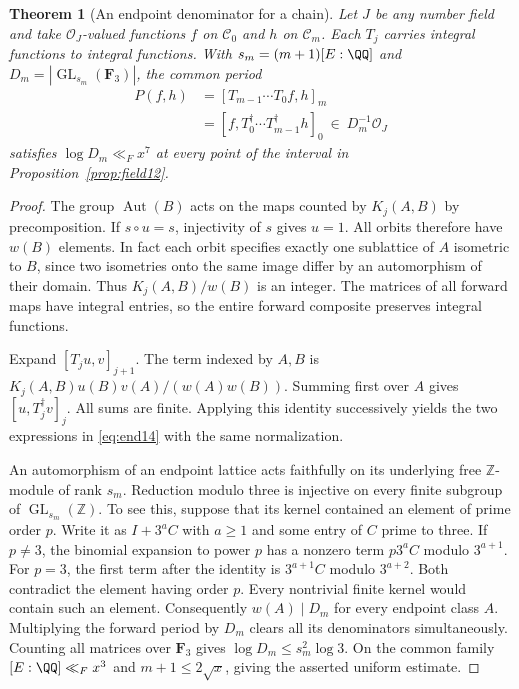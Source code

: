 \documentclass[a4paper,11pt]{article}
\newtheorem{theorem}[proposition]{Theorem}
\theoremstyle{definition}
\theoremstyle{remark}
\newcommand{\ZZ}{\mathbb Z}\newcommand{\ord}{\operatorname{ord}}
\numberwithin{equation}{section}
\begin{document}
\begin{theorem}[An endpoint denominator for a chain]\label{thm:end14}
Let \(J\) be any number field and take \(\mathcal O_J\)-valued functions \(f\) on \(\mathcal C_0\) and \(h\) on \(\mathcal C_m\). Each \(T_j\) carries integral functions to integral functions. With \(s_m=(m+1)[E:\QQ]\) and \(D_m=|\operatorname{GL}_{s_m}(\mathbf F_3)|\), the common period
\begin{equation}
 \begin{split}
   P(f,h)&=[T_{m-1}\cdots T_0 f,h]_m\\
         &=[f,T_0^\dagger\cdots T_{m-1}^\dagger h]_0
                                  \ \in\ D_m^{-1}\mathcal O_J
 \end{split}\label{eq:end14}
\end{equation}
satisfies \(\log D_m\ll_F x^7\) at every point of the interval in Proposition~\ref{prop:field12}.
\end{theorem}
\begin{proof}
The group \(\operatorname{Aut}(B)\) acts on the maps counted by \(K_j(A,B)\) by precomposition. If \(s\circ u=s\), injectivity of \(s\) gives \(u=1\). All orbits therefore have \(w(B)\) elements. In fact each orbit specifies exactly one sublattice of \(A\) isometric to \(B\), since two isometries onto the same image differ by an automorphism of their domain. Thus \(K_j(A,B)/w(B)\) is an integer. The matrices of all forward maps have integral entries, so the entire forward composite preserves integral functions.

Expand \([T_ju,v]_{j+1}\). The term indexed by \(A,B\) is \(K_j(A,B)u(B)v(A)/(w(A)w(B))\). Summing first over \(A\) gives \([u,T_j^\dagger v]_j\). All sums are finite. Applying this identity successively yields the two expressions in \eqref{eq:end14} with the same normalization.

An automorphism of an endpoint lattice acts faithfully on its underlying free \(\ZZ\)-module of rank \(s_m\). Reduction modulo three is injective on every finite subgroup of \(\operatorname{GL}_{s_m}(\ZZ)\). To see this, suppose that its kernel contained an element of prime order \(p\). Write it as \(I+3^a C\) with \(a\ge1\) and some entry of \(C\) prime to three. If \(p\ne3\), the binomial expansion to power \(p\) has a nonzero term \(p3^a C\) modulo \(3^{a+1}\). For \(p=3\), the first term after the identity is \(3^{a+1}C\) modulo \(3^{a+2}\). Both contradict the element having order \(p\). Every nontrivial finite kernel would contain such an element. Consequently \(w(A)\mid D_m\) for every endpoint class \(A\). Multiplying the forward period by \(D_m\) clears all its denominators simultaneously. Counting all matrices over \(\mathbf F_3\) gives \(\log D_m\le s_m^2\log3\). On the common family \([E:\QQ]\ll_F x^3\) and \(m+1\le2\sqrt x\), giving the asserted uniform estimate.
\end{proof}
\end{document}
